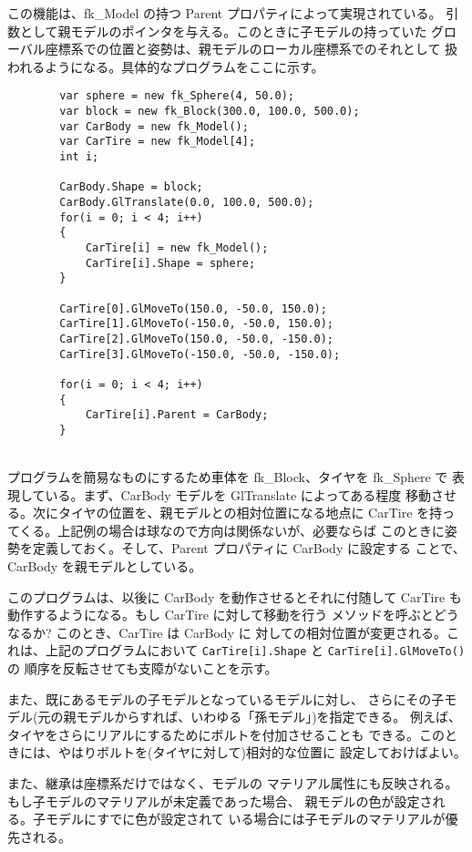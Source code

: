 この機能は、fk\_Model の持つ Parent プロパティによって実現されている。
引数として親モデルのポインタを与える。このときに子モデルの持っていた
グローバル座標系での位置と姿勢は、親モデルのローカル座標系でのそれとして
扱われるようになる。具体的なプログラムをここに示す。
\\
\begin{breakbox}
\begin{verbatim}
        var sphere = new fk_Sphere(4, 50.0);
        var block = new fk_Block(300.0, 100.0, 500.0);
        var CarBody = new fk_Model();
        var CarTire = new fk_Model[4];
        int i;

        CarBody.Shape = block;
        CarBody.GlTranslate(0.0, 100.0, 500.0);
        for(i = 0; i < 4; i++)
        {
            CarTire[i] = new fk_Model();
            CarTire[i].Shape = sphere;
        }

        CarTire[0].GlMoveTo(150.0, -50.0, 150.0);
        CarTire[1].GlMoveTo(-150.0, -50.0, 150.0);
        CarTire[2].GlMoveTo(150.0, -50.0, -150.0);
        CarTire[3].GlMoveTo(-150.0, -50.0, -150.0);

        for(i = 0; i < 4; i++)
        {
            CarTire[i].Parent = CarBody;
        }
\end{verbatim}
\end{breakbox}
~ \\
プログラムを簡易なものにするため車体を fk\_Block、タイヤを fk\_Sphere で
表現している。まず、CarBody モデルを GlTranslate によってある程度
移動させる。次にタイヤの位置を、親モデルとの相対位置になる地点に
CarTire を持ってくる。上記例の場合は球なので方向は関係ないが、必要ならば
このときに姿勢を定義しておく。そして、Parent プロパティに CarBody に設定する
ことで、CarBody を親モデルとしている。

このプログラムは、以後に CarBody を動作させるとそれに付随して
CarTire も動作するようになる。もし CarTire に対して移動を行う
メソッドを呼ぶとどうなるか? このとき、CarTire は CarBody に
対しての相対位置が変更される。これは、上記のプログラムにおいて
{\tt CarTire[i].Shape} と {\tt CarTire[i].GlMoveTo()} の
順序を反転させても支障がないことを示す。

また、既にあるモデルの子モデルとなっているモデルに対し、
さらにその子モデル(元の親モデルからすれば、いわゆる「孫モデル」)を指定できる。
例えば、タイヤをさらにリアルにするためにボルトを付加させることも
できる。このときには、やはりボルトを(タイヤに対して)相対的な位置に
設定しておけばよい。

また、継承は座標系だけではなく、モデルの
マテリアル属性にも反映される。もし子モデルのマテリアルが未定義であった場合、
親モデルの色が設定される。子モデルにすでに色が設定されて
いる場合には子モデルのマテリアルが優先される。

